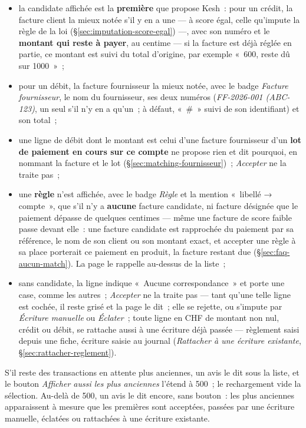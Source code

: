 \documentclass[a4paper,11pt,oneside]{article}
\begin{document}
\begin{itemize}
    \item la candidate affichée est la \textbf{première} que propose Kesh~: pour un crédit, la facture client la mieux notée s'il y en a une --- à score égal, celle qu'impute la règle de la loi (\S\ref{sec:imputation-score-egal}) ---, avec son numéro et le \textbf{montant qui reste à payer}, au centime --- si la facture est déjà réglée en partie, ce montant est suivi du total d'origine, par exemple «~600, reste dû sur 1000~»~;
    \item pour un débit, la facture fournisseur la mieux notée, avec le badge \emph{Facture fournisseur}, le nom du fournisseur, ses deux numéros (\emph{FF-2026-001 (ABC-123)}, un seul s'il n'y en a qu'un~; à défaut, «~\#~» suivi de son identifiant) et son total~;
    \item une ligne de débit dont le montant est celui d'une facture fournisseur d'un \textbf{lot de paiement en cours sur ce compte} ne propose rien et dit pourquoi, en nommant la facture et le lot (\S\ref{sec:matching-fournisseur})~; \emph{Accepter} ne la traite pas~;
    \item une \textbf{règle} n'est affichée, avec le badge \emph{Règle} et la mention «~libellé → compte~», que s'il n'y a \textbf{aucune} facture candidate, ni facture désignée que le paiement dépasse de quelques centimes --- même une facture de score faible passe devant elle~: une facture candidate est rapprochée du paiement par sa référence, le nom de son client ou son montant exact, et accepter une règle à sa place porterait ce paiement en produit, la facture restant due (\S\ref{sec:faq-aucun-match}). La page le rappelle au-dessus de la liste~;
    \item sans candidate, la ligne indique «~Aucune correspondance~» et porte une case, comme les autres~; \emph{Accepter} ne la traite pas --- tant qu'une telle ligne est cochée, il reste grisé et la page le dit~; elle se rejette, ou s'impute par \emph{Écriture manuelle} ou \emph{Éclater}~; toute ligne en CHF de montant non nul, crédit ou débit, se rattache aussi à une écriture déjà passée --- règlement saisi depuis une fiche, écriture saisie au journal (\emph{Rattacher à une écriture existante}, \S\ref{sec:rattacher-reglement}).
\end{itemize}

S'il reste des transactions en attente plus anciennes, un avis le dit sous la liste, et le bouton \emph{Afficher aussi les plus anciennes} l'étend à 500~; le rechargement vide la sélection. Au-delà de 500, un avis le dit encore, sans bouton~: les plus anciennes apparaissent à mesure que les premières sont acceptées, passées par une écriture manuelle, éclatées ou rattachées à une écriture existante.
\end{document}
